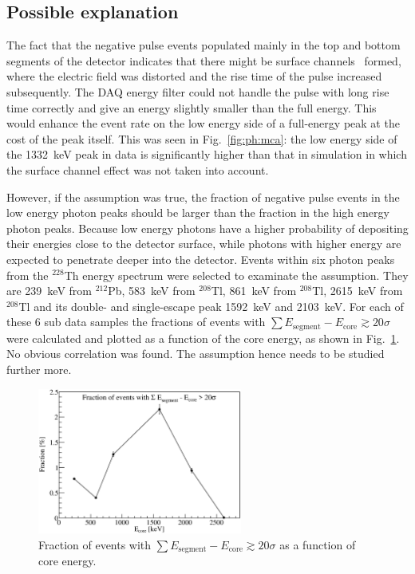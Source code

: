 \subsection{Possible explanation}
\label{s:ii:exp}
The fact that the negative pulse events populated mainly in the top and bottom segments of the detector indicates that there might be surface channels~\cite{Sur05} formed, where the electric field was distorted and the rise time of the pulse increased subsequently. The DAQ energy filter could not handle the pulse with long rise time correctly and give an energy slightly smaller than the full energy. This would enhance the event rate on the low energy side of a full-energy peak at the cost of the peak itself. This was seen in Fig.~\ref{fig:ph:mca}: the low energy side of the 1332~keV peak in data is significantly higher than that in simulation in which the surface channel effect was not taken into account.

However, if the assumption was true, the fraction of negative pulse events in the low energy photon peaks should be larger than the fraction in the high energy photon peaks. Because low energy photons have a higher probability of depositing their energies close to the detector surface, while photons with higher energy are expected to penetrate deeper into the detector. Events within six photon peaks from the $^{228}$Th energy spectrum were selected to examinate the assumption. They are 239~keV from $^{212}$Pb, 583~keV from $^{208}$Tl, 861~keV from $^{208}$Tl, 2615~keV from $^{208}$Tl and its double- and single-escape peak 1592~keV and 2103~keV. For each of these 6 sub data samples the fractions of events with $\sum E_{\text{segment}} - E_{\text{core}} \gtrsim 20\sigma$ were calculated and plotted as a function of the core energy, as shown in Fig.~\ref{f:fnp_e}. No obvious correlation was found. The assumption hence needs to be studied further more. 

\begin{figure}[tphb]
\centering
\includegraphics[width=0.6\textwidth]{fnp_e}
\caption{Fraction of events with $\sum E_{\text{segment}} - E_{\text{core}} \gtrsim 20\sigma$ as a function of core energy.}
\label{f:fnp_e}
\end{figure}

